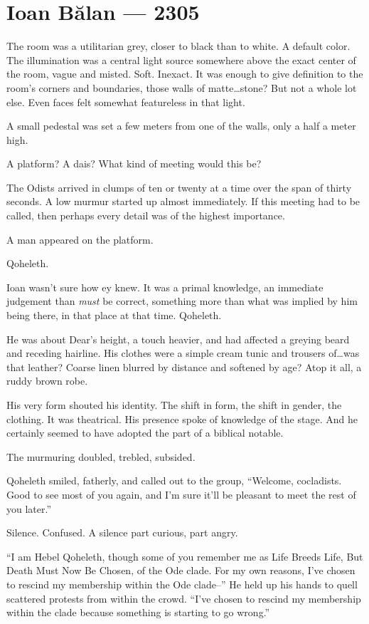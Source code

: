 \hypertarget{ioan-bux103lan-2305}{%
\chapter*{Ioan Bălan — 2305}\label{ioan-bux103lan-2305}}

The room was a utilitarian grey, closer to black than to white. A default color. The illumination was a central light source somewhere above the exact center of the room, vague and misted. Soft. Inexact. It was enough to give definition to the room's corners and boundaries, those walls of matte\ldots{}stone? But not a whole lot else. Even faces felt somewhat featureless in that light.

A small pedestal was set a few meters from one of the walls, only a half a meter high.

A platform? A dais? What kind of meeting would this be?

The Odists arrived in clumps of ten or twenty at a time over the span of thirty seconds. A low murmur started up almost immediately. If this meeting had to be called, then perhaps every detail was of the highest importance.

A man appeared on the platform.

Qoheleth.

Ioan wasn't sure how ey knew. It was a primal knowledge, an immediate judgement than \emph{must} be correct, something more than what was implied by him being there, in that place at that time. Qoheleth.

He was about Dear's height, a touch heavier, and had affected a greying beard and receding hairline. His clothes were a simple cream tunic and trousers of\ldots{}was that leather? Coarse linen blurred by distance and softened by age? Atop it all, a ruddy brown robe.

His very form shouted his identity. The shift in form, the shift in gender, the clothing. It was theatrical. His presence spoke of knowledge of the stage. And he certainly seemed to have adopted the part of a biblical notable.

The murmuring doubled, trebled, subsided.

Qoheleth smiled, fatherly, and called out to the group, ``Welcome, cocladists. Good to see most of you again, and I'm sure it'll be pleasant to meet the rest of you later.''

Silence. Confused. A silence part curious, part angry.

``I am Hebel Qoheleth, though some of you remember me as Life Breeds Life, But Death Must Now Be Chosen, of the Ode clade. For my own reasons, I've chosen to rescind my membership within the Ode clade--'' He held up his hands to quell scattered protests from within the crowd. ``I've chosen to rescind my membership within the clade because something is starting to go wrong.''

